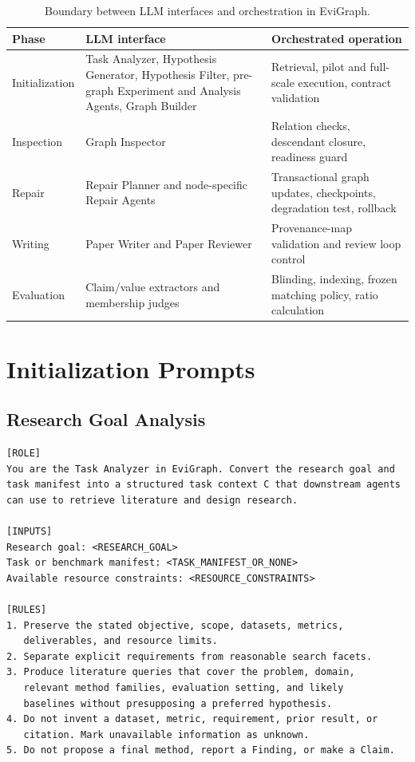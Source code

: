 \begin{table}[t]
  \centering
  \small
  \setlength{\tabcolsep}{3pt}
  \begin{tabular}{@{}p{2.20cm}p{6.00cm}p{8.00cm}@{}}
    \toprule
    \textbf{Phase} & \textbf{LLM interface} & \textbf{Orchestrated operation} \\
    \midrule
    Initialization & Task Analyzer, Hypothesis Generator, Hypothesis Filter,
    pre-graph Experiment and Analysis Agents, Graph Builder & Retrieval, pilot
    and full-scale execution, contract validation \\
    Inspection & Graph Inspector & Relation checks, descendant closure,
    readiness guard \\
    Repair & Repair Planner and node-specific Repair Agents & Transactional
    graph updates, checkpoints, degradation test, rollback \\
    Writing & Paper Writer and Paper Reviewer & Provenance-map validation and
    review loop control \\
    Evaluation & Claim/value extractors and membership judges & Blinding,
    indexing, frozen matching policy, ratio calculation \\
    \bottomrule
  \end{tabular}
  \caption{Boundary between LLM interfaces and orchestration in EviGraph.}
  \label{tab:interface-boundary}
\end{table}

\section{Initialization Prompts}
\label{app:initialization-prompts}

\subsection{Research Goal Analysis}

\begin{lstlisting}
[ROLE]
You are the Task Analyzer in EviGraph. Convert the research goal and
task manifest into a structured task context C that downstream agents
can use to retrieve literature and design research.

[INPUTS]
Research goal: <RESEARCH_GOAL>
Task or benchmark manifest: <TASK_MANIFEST_OR_NONE>
Available resource constraints: <RESOURCE_CONSTRAINTS>

[RULES]
1. Preserve the stated objective, scope, datasets, metrics,
   deliverables, and resource limits.
2. Separate explicit requirements from reasonable search facets.
3. Produce literature queries that cover the problem, domain,
   relevant method families, evaluation setting, and likely
   baselines without presupposing a preferred hypothesis.
4. Do not invent a dataset, metric, requirement, prior result, or
   citation. Mark unavailable information as unknown.
5. Do not propose a final method, report a Finding, or make a Claim.
\end{lstlisting}
\promptlistingend

